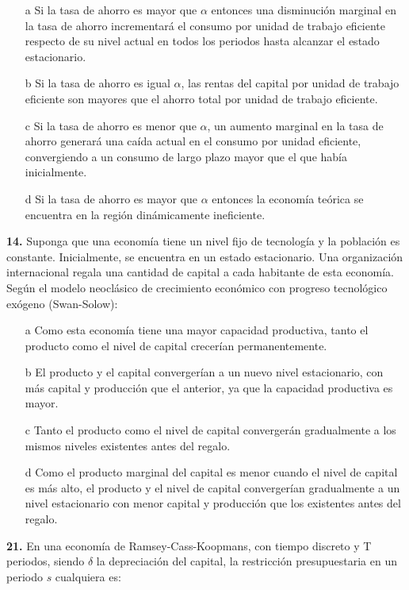 \documentclass{nuevotema}
\begin{document}
\begin{itemize}
	\item[a] Si la tasa de ahorro es mayor que $\alpha$ entonces una disminución marginal en la tasa de ahorro incrementará el consumo por unidad de trabajo eficiente respecto de su nivel actual en todos los periodos hasta alcanzar el estado estacionario.
	\item[b] Si la tasa de ahorro es igual $\alpha$, las rentas del capital por unidad de trabajo eficiente son mayores que el ahorro total por unidad de trabajo eficiente.
	\item[c] Si la tasa de ahorro es menor que $\alpha$, un aumento marginal en la tasa de ahorro generará una caída actual en el consumo por unidad eficiente, convergiendo a un consumo de largo plazo mayor que el que había inicialmente.
	\item[d] Si la tasa de ahorro es mayor que $\alpha$ entonces la economía teórica se encuentra en la región dinámicamente ineficiente. 
\end{itemize}

\textbf{14.} Suponga que una economía tiene un nivel fijo de tecnología y la población es constante. Inicialmente, se encuentra en un estado estacionario. Una organización internacional regala una cantidad de capital a cada habitante de esta economía. Según el modelo neoclásico de crecimiento económico con progreso tecnológico exógeno (Swan-Solow):

\begin{itemize}
	\item[a] Como esta economía tiene una mayor capacidad productiva, tanto el producto como el nivel de capital crecerían permanentemente.
	\item[b] El producto y el capital convergerían a un nuevo nivel estacionario, con más capital y producción que el anterior, ya que la capacidad productiva es mayor.
	\item[c] Tanto el producto como el nivel de capital convergerán gradualmente a los mismos niveles existentes antes del regalo.
	\item[d] Como el producto marginal del capital es menor cuando el nivel de capital es más alto, el producto y el nivel de capital convergerían gradualmente a un nivel estacionario con menor capital y producción que los existentes antes del regalo.
\end{itemize}


\textbf{21.} En una economía de Ramsey-Cass-Koopmans, con tiempo discreto y T periodos, siendo $\delta$ la depreciación del capital, la restricción presupuestaria en un periodo $s$ cualquiera es:
\end{document}
